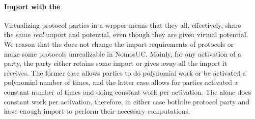 %

\paragraph{Import with the \partywrapper}
Virtualizing protocol parties in a wrpper means that they all, effectively, share the same \emph{real} import and potential, even though they are given virtual potential.
We reason that the \partywrapper does not change the import requirements of protocols or make some protocols unrealizable in NomosUC.
Mainly, for any activation of a party, the party either retains some import or gives away all the import it receives. 
The former case allows parties to do polynomial work or be activated a polynomial number of times, and the latter case allows for parties activated a constant number of times and doing constant work per activation.
The \partywrapper alone does constant work per activation, therefore, in either case boththe protocol party and \partywrapper have enough import to perform their necessary computations.

